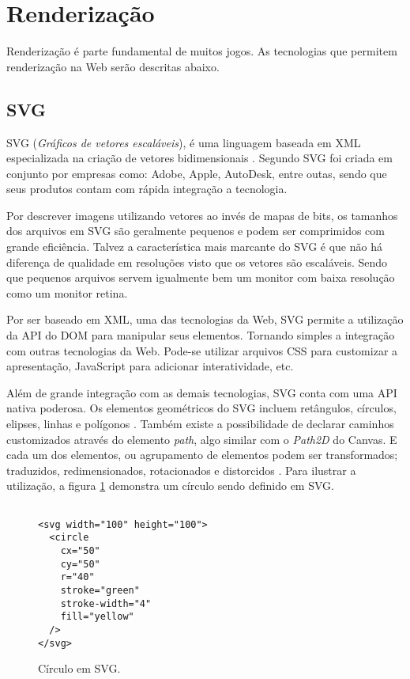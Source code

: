 \section{Renderização}
Renderização é parte fundamental de muitos jogos. As tecnologias que
permitem renderização na Web serão descritas abaixo.
\subsection{SVG}
SVG (\textit{Gráficos de vetores escaláveis}), é uma linguagem
baseada em XML especializada na criação de vetores bidimensionais
\autocite{html5mostwanted}. Segundo \citet[p. 4]{svgTime} SVG foi criada
em conjunto por empresas como: Adobe, Apple, AutoDesk, entre outas,
sendo que seus produtos contam com rápida integração a tecnologia.

Por descrever imagens utilizando vetores ao invés de mapas de bits,
os tamanhos dos arquivos em SVG são geralmente pequenos e podem
ser comprimidos com grande eficiência. Talvez a característica mais
marcante do SVG é que não há diferença de qualidade em resoluções
visto que os vetores são escaláveis. Sendo que pequenos arquivos
servem igualmente bem um monitor com baixa resolução como um monitor
retina.

Por ser baseado em XML, uma das tecnologias da Web, SVG permite a
utilização da API do DOM para manipular seus elementos. Tornando
simples a integração com outras tecnologias da Web. Pode-se utilizar
arquivos CSS para customizar a apresentação, JavaScript para adicionar
interatividade, etc.

Além de grande integração com as demais tecnologias, SVG conta com
uma API nativa poderosa. Os elementos geométricos do SVG incluem
retângulos, círculos, elipses, linhas e polígonos \autocite[p.
5]{svgTime}. Também existe a possibilidade de declarar caminhos
customizados através do elemento \textit{path}, algo similar com o
\textit{Path2D} do Canvas. E cada um dos elementos, ou agrupamento
de elementos podem ser transformados; traduzidos, redimensionados,
rotacionados e distorcidos \autocite[p. 5]{svgTime}. Para ilustrar a
utilização, a figura \ref{fig:svgCircle} demonstra um círculo sendo
definido em SVG.

\begin{figure}[H]
\centering
\begin{verbatim}

<svg width="100" height="100">
  <circle 
    cx="50" 
    cy="50" 
    r="40" 
    stroke="green" 
    stroke-width="4" 
    fill="yellow" 
  />
</svg>

\end{verbatim}
\caption{Círculo em SVG.}
\label{fig:svgCircle}
\end{figure}

